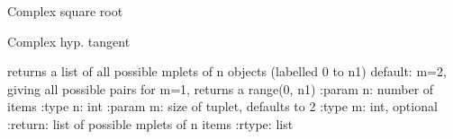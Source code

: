 \documentclass[letterpaper,10pt,english]{sphinxmanual}
\begin{document}

\begin{fulllineitems}
\label{\detokenize{spinbox:spinbox.core.csqrt}}
\pysigstartsignatures
{}
\pysigstopsignatures
\sphinxAtStartPar
Complex square root

\end{fulllineitems}


\begin{fulllineitems}
\label{\detokenize{spinbox:spinbox.core.ctanh}}
\pysigstartsignatures
{}
\pysigstopsignatures
\sphinxAtStartPar
Complex hyp. tangent

\end{fulllineitems}


\begin{fulllineitems}
\label{\detokenize{spinbox:spinbox.core.interaction_indices}}
\pysigstartsignatures
{}
\pysigstopsignatures
\sphinxAtStartPar
returns a list of all possible m\sphinxhyphen{}plets of n objects (labelled 0 to n\sphinxhyphen{}1)
default: m=2, giving all possible pairs
for m=1, returns a range(0, n\sphinxhyphen{}1)
:param n: number of items
:type n: int
:param m: size of tuplet, defaults to 2
:type m: int, optional
:return: list of possible m\sphinxhyphen{}plets of n items
:rtype: list

\end{fulllineitems}

\end{document}
